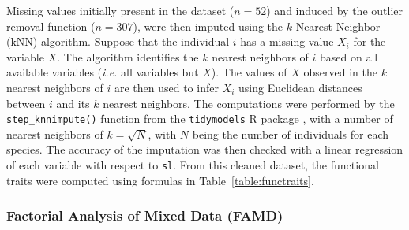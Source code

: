 Missing values initially present in the dataset ($n = 52$) and induced by the outlier removal function ($n = 307$), were then imputed using the $k$-Nearest Neighbor (kNN) algorithm. Suppose that the individual $i$ has a missing value $X_i$ for the variable $X$. The algorithm identifies the $k$ nearest neighbors of $i$ based on all available variables (\emph{i.e.} all variables but $X$). The values of $X$ observed in the $k$ nearest neighbors of $i$ are then used to infer $X_i$ using Euclidean distances between $i$ and its $k$ nearest neighbors. The computations were performed by the \texttt{step\_knnimpute()} function from the \texttt{tidymodels} R package \citep{kuhn2020}, with a number of nearest neighbors of $k = \sqrt{N}$, with $N$ being the number of individuals for each species. The accuracy of the imputation was then checked with a linear regression of each variable with respect to \texttt{sl}. From this cleaned dataset, the functional traits were computed using formulas in Table~\ref{table:functraits}. 

\subsubsection{Factorial Analysis of Mixed Data (FAMD)}


